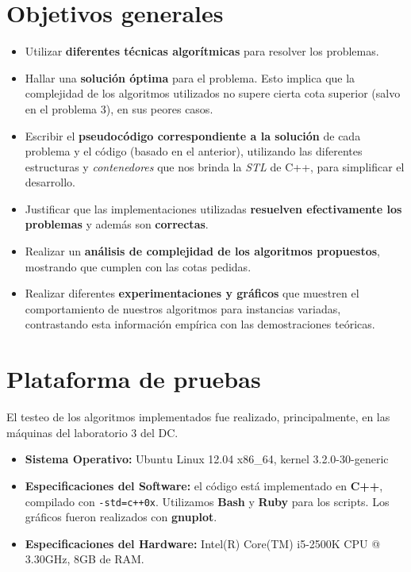 \documentclass[a4paper]{article}
\begin{document}
\section{Objetivos generales}
\begin{itemize}
  \item Utilizar \textbf{diferentes técnicas algorítmicas} para resolver los problemas.

  \item Hallar una \textbf{solución óptima} para el problema. Esto implica que la complejidad de los
  algoritmos utilizados no supere cierta cota superior (salvo en el problema 3), en sus peores casos.

  \item Escribir el \textbf{pseudocódigo correspondiente a la solución} de cada problema y el código
  (basado en el anterior), utilizando las diferentes estructuras y \textit{contenedores} que nos
  brinda la \textit{STL} de C++, para simplificar el desarrollo.

  \item Justificar que las implementaciones utilizadas \textbf{resuelven efectivamente los problemas} y
  además son \textbf{correctas}.

  \item Realizar un \textbf{análisis de complejidad de los algoritmos propuestos}, mostrando que cumplen
  con las cotas pedidas.

  \item Realizar diferentes \textbf{experimentaciones y gráficos} que muestren el comportamiento de nuestros
  algoritmos para instancias variadas, contrastando esta información empírica con las demostraciones
  teóricas.
\end{itemize}

\newpage

\section{Plataforma de pruebas}
El testeo de los algoritmos implementados fue realizado, principalmente, en las máquinas del laboratorio 3 del DC. \newline
\begin{itemize}
  \item \textbf{Sistema Operativo:} Ubuntu Linux 12.04 x86_64, kernel 3.2.0-30-generic

  \item \textbf{Especificaciones del Software:} el código está implementado en \textbf{C++}, compilado con \verb|-std=c++0x|.
  Utilizamos \textbf{Bash} y \textbf{Ruby} para los scripts. Los gráficos fueron realizados con \textbf{gnuplot}.

  \item \textbf{Especificaciones del Hardware:} Intel(R) Core(TM) i5-2500K CPU @ 3.30GHz, 8GB de RAM.
\end{itemize}
\end{document}
